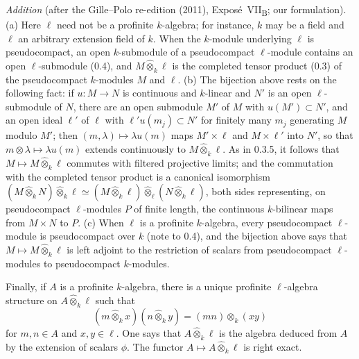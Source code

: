 \medskip\noindent
\emph{Addition} (after the Gille--Polo re-edition (2011), Expos\'e~VII\textsubscript{B}; our formulation).
(a) Here \(\ell\) need not be a profinite \(k\)-algebra; for instance, \(k\) may be a field and \(\ell\)
an arbitrary extension field of \(k\). When the \(k\)-module underlying \(\ell\) is pseudocompact, an
open \(k\)-submodule of a pseudocompact \(\ell\)-module contains an open \(\ell\)-submodule (0.4), and
\(M\widehat\otimes_k\ell\) is the completed tensor product (0.3) of the pseudocompact \(k\)-modules \(M\)
and \(\ell\). (b) The bijection above rests on the following fact: if \(u\colon M\to N\) is continuous and
\(k\)-linear and \(N'\) is an open \(\ell\)-submodule of \(N\), there are an open submodule \(M'\) of \(M\)
with \(u(M')\subset N'\), and an open ideal \(\ell'\) of \(\ell\) with \(\ell'u(m_j)\subset N'\) for
finitely many \(m_j\) generating \(M\) modulo \(M'\); then \((m,\lambda)\mapsto\lambda u(m)\) maps
\(M'\times\ell\) and \(M\times\ell'\) into \(N'\), so that \(m\otimes\lambda\mapsto\lambda u(m)\) extends
continuously to \(M\widehat\otimes_k\ell\). As in 0.3.5, it follows that \(M\mapsto M\widehat\otimes_k\ell\)
commutes with filtered projective limits; and the commutation with the completed tensor product is a
canonical isomorphism \((M\widehat\otimes_kN)\widehat\otimes_k\ell\simeq(M\widehat\otimes_k\ell)
\widehat\otimes_\ell(N\widehat\otimes_k\ell)\), both sides representing, on pseudocompact
\(\ell\)-modules \(P\) of finite length, the continuous \(k\)-bilinear maps from \(M\times N\) to \(P\).
(c) When \(\ell\) is a profinite \(k\)-algebra, every pseudocompact \(\ell\)-module is pseudocompact over
\(k\) (note to 0.4), and the bijection above says that \(M\mapsto M\widehat\otimes_k\ell\) is left adjoint
to the restriction of scalars from pseudocompact \(\ell\)-modules to pseudocompact \(k\)-modules.

Finally, if \(A\) is a profinite \(k\)-algebra, there is a unique
profinite \(\ell\)-algebra structure on \(A\widehat{\otimes}_k\ell\) such
that
\[
  (m\widehat{\otimes}_kx)(n\widehat{\otimes}_ky)
  =
  (mn)\widehat{\otimes}_k(xy)
\]
for \(m,n\in A\) and \(x,y\in\ell\). One says that
\(A\widehat{\otimes}_k\ell\) is the algebra deduced from \(A\) by the
extension of scalars \(\phi\). The functor
\(A\mapsto A\widehat{\otimes}_k\ell\) is right exact.
